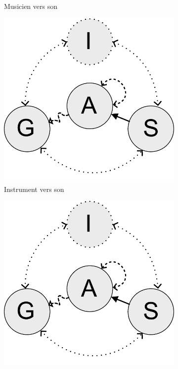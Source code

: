 \begin{figure}[!htbp]
{\begin{subfigure}[b]{.33\textwidth}
			\caption{Musicien vers son}
		\end{subfigure}%
		\hspace{.02\linewidth}
		\begin{subfigure}[b]{.33\textwidth}
			\centering
			\includegraphics[width=0.9\linewidth]{gfx/03_gesture/gesture-inference-a.pdf}
			\caption{Instrument vers son}
		\end{subfigure}%
		\hspace{.02\linewidth}
		\begin{subfigure}[b]{.33\textwidth}
			\centering
			\includegraphics[width=0.9\linewidth]{gfx/03_gesture/gesture-inference-a.pdf}

\end{subfigure}}
\end{figure}
